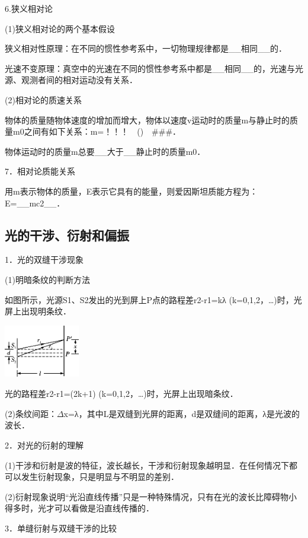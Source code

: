 6.狭义相对论

(1)狭义相对论的两个基本假设

狭义相对性原理：在不同的惯性参考系中，一切物理规律都是\_\_相同\_\_的．

光速不变原理：真空中的光速在不同的惯性参考系中都是\_\_相同\_\_的，光速与光源、观测者间的相对运动没有关系．

(2)相对论的质速关系

物体的质量随物体速度的增加而增大，物体以速度v运动时的质量m与静止时的质量m0之间有如下关系：m=！！！　()　\#\#\#．

物体运动时的质量m总要\_\_大于\_\_静止时的质量m0．

7．相对论质能关系

用m表示物体的质量，E表示它具有的能量，则爱因斯坦质能方程为：E=\_\_mc2\_\_．
\subsection{光的干涉、衍射和偏振}

1．光的双缝干涉现象

(1)明暗条纹的判断方法

如图所示，光源S1、S2发出的光到屏上P点的路程差r2-r1=kλ
(k=0,1,2，\ldots)时，光屏上出现明条纹．

\begin{center}\includegraphics[width=1.30208in,height=0.90556in]{media/image558.png}\end{center}

光的路程差r2-r1=(2k+1)
(k=0,1,2，\ldots)时，光屏上出现暗条纹．

(2)条纹间距：$\Delta$x=λ，其中L是双缝到光屏的距离，d是双缝间的距离，λ是光波的波长．

2．对光的衍射的理解

(1)干涉和衍射是波的特征，波长越长，干涉和衍射现象越明显．在任何情况下都可以发生衍射现象，只是明显与不明显的差别．

(2)衍射现象说明``光沿直线传播''只是一种特殊情况，只有在光的波长比障碍物小得多时，光才可以看做是沿直线传播的．

3．单缝衍射与双缝干涉的比较

